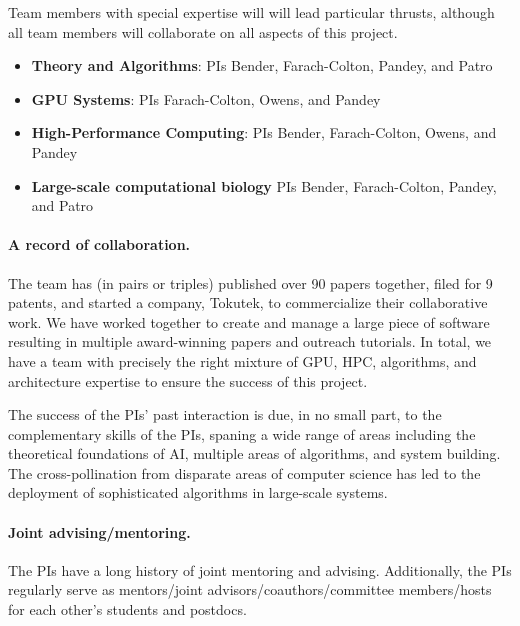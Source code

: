 Team members with special expertise will will lead particular thrusts, although all team members will collaborate on all aspects of this project.
\begin{itemize}%
    \item \textbf{Theory and Algorithms}: PIs Bender, Farach-Colton, Pandey, and Patro
    

    \item \textbf{GPU Systems}: PIs Farach-Colton, Owens, and Pandey

    \item \textbf{High-Performance Computing}: PIs Bender, Farach-Colton, Owens, and Pandey

    \item \textbf{Large-scale computational biology} PIs Bender, Farach-Colton, Pandey, and Patro

\end{itemize}



\paragraph{A record of collaboration.} The team has (in pairs or triples) published over 90 papers together, filed for
9 patents, and started a company, Tokutek, to commercialize their collaborative work. We have worked
together to create and manage a large piece of software resulting in multiple award-winning papers and
outreach tutorials. In total, we have a team with precisely the right mixture of GPU, HPC, algorithms, and architecture expertise to ensure the success of this project.

The success of the PIs’ past interaction is due, in no small part, to the complementary skills of the PIs,
spaning a wide range of areas including the theoretical foundations of AI, multiple areas of algorithms, and
system building. The cross-pollination from disparate areas of
computer science has led to the deployment of sophisticated algorithms in large-scale systems.

\paragraph{Joint advising/mentoring.} The PIs have a long history of joint mentoring and advising.  Additionally, the PIs regularly serve as mentors/joint advisors/coauthors/committee members/hosts for each other’s students and postdocs.


